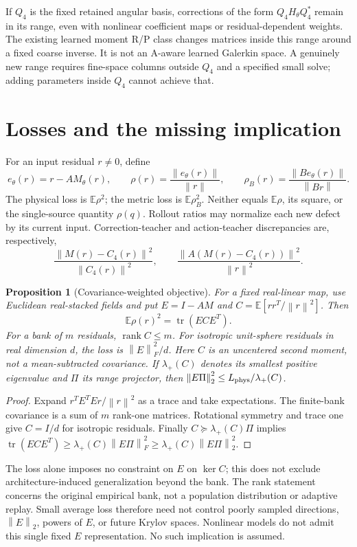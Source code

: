 \documentclass[11pt]{article}
\newtheorem{proposition}{Proposition}
\newcommand{\norm}[1]{\left\|#1\right\|}
\begin{document}
If $Q_4$ is the fixed retained angular basis, corrections of the form
$Q_4 H_\theta Q_4^*$ remain in its range, even with nonlinear coefficient maps
or residual-dependent weights. The existing learned moment R/P class changes
matrices inside this range around a fixed coarse inverse. It is not an
A-aware learned Galerkin space. A genuinely new range requires fine-space
columns outside $Q_4$ and a specified small solve; adding parameters inside
$Q_4$ cannot achieve that.

\section{Losses and the missing implication}
For an input residual $r\ne0$, define
\[
 e_\theta(r)=r-AM_\theta(r),\qquad
 \rho(r)=\frac{\norm{e_\theta(r)}}{\norm r},\qquad
 \rho_B(r)=\frac{\norm{Be_\theta(r)}}{\norm{Br}}.
\]
The physical loss is $\mathbb E\rho^2$; the metric loss is
$\mathbb E\rho_B^2$. Neither equals $\mathbb E\rho$, its square, or the
single-source quantity $\rho(q)$. Rollout ratios may normalize each new defect
by its current input. Correction-teacher and action-teacher discrepancies are,
respectively,
\[
 \frac{\norm{M(r)-C_4(r)}^2}{\norm{C_4(r)}^2},\qquad
 \frac{\norm{A(M(r)-C_4(r))}^2}{\norm r^2}.
\]

\begin{proposition}[Covariance-weighted objective]\label{prop:cov}
For a fixed real-linear map, use Euclidean real-stacked fields and put $E=I-AM$ and
$C=\mathbb E[rr^T/\norm r^2]$. Then
\[
 \mathbb E\rho(r)^2=\operatorname{tr}(ECE^T).
\]
For a bank of $m$ residuals, $\operatorname{rank}C\leq m$. For isotropic
unit-sphere residuals in real dimension $d$, the loss is $\norm E_F^2/d$.
Here $C$ is an uncentered second moment, not a mean-subtracted covariance.
If $\lambda_+(C)$ denotes its smallest positive eigenvalue and $\Pi$ its
range projector, then $\norm{E\Pi}_2^2\leq L_{\rm phys}/\lambda_+(C)$.
\end{proposition}
\begin{proof}
Expand $r^TE^TEr/\norm r^2$ as a trace and take expectations. The finite-bank
covariance is a sum of $m$ rank-one matrices. Rotational symmetry and trace one
give $C=I/d$ for isotropic residuals.
Finally $C\succeq\lambda_+(C)\Pi$ implies
$\operatorname{tr}(ECE^T)\geq\lambda_+(C)\norm{E\Pi}_F^2
\geq\lambda_+(C)\norm{E\Pi}_2^2$.
\end{proof}
The loss alone imposes no constraint on $E$ on $\ker C$; this does not exclude
architecture-induced generalization beyond the bank. The rank statement concerns
the original empirical bank, not a population distribution or adaptive replay.
Small average loss therefore need not control poorly sampled directions,
$\norm E_2$, powers of $E$, or future Krylov spaces. Nonlinear models do not
admit this single fixed $E$ representation. No such implication is assumed.
\end{document}
